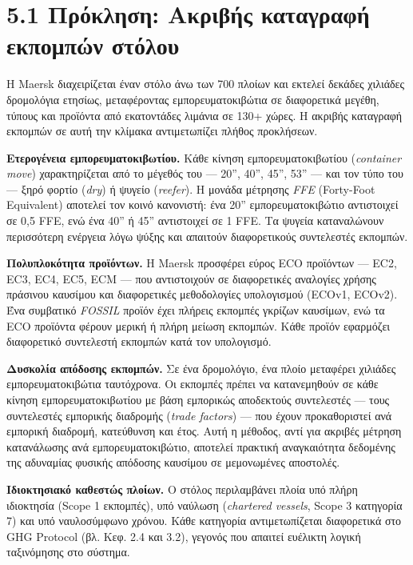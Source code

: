 \documentclass[11pt,a4paper,greek,twoside]{template-xe}
\begin{document}
\section{5.1 Πρόκληση: Ακριβής καταγραφή εκπομπών
στόλου}\label{ux3c0ux3c1ux3ccux3baux3bbux3b7ux3c3ux3b7-ux3b1ux3baux3c1ux3b9ux3b2ux3aeux3c2-ux3baux3b1ux3c4ux3b1ux3b3ux3c1ux3b1ux3c6ux3ae-ux3b5ux3baux3c0ux3bfux3bcux3c0ux3ceux3bd-ux3c3ux3c4ux3ccux3bbux3bfux3c5}

Η Maersk διαχειρίζεται έναν στόλο άνω των 700 πλοίων και εκτελεί δεκάδες
χιλιάδες δρομολόγια ετησίως, μεταφέροντας εμπορευματοκιβώτια σε
διαφορετικά μεγέθη, τύπους και προϊόντα από εκατοντάδες λιμάνια σε 130+
χώρες. Η ακριβής καταγραφή εκπομπών σε αυτή την κλίμακα αντιμετωπίζει
πλήθος προκλήσεων.

\textbf{Ετερογένεια εμπορευματοκιβωτίου.} Κάθε κίνηση
εμπορευματοκιβωτίου (\emph{container move}) χαρακτηρίζεται από το
μέγεθός του --- 20'', 40'', 45'', 53'' --- και τον τύπο του --- ξηρό
φορτίο (\emph{dry}) ή ψυγείο (\emph{reefer}). Η μονάδα μέτρησης
\emph{FFE} (Forty-Foot Equivalent) αποτελεί τον κοινό κανονιστή: ένα
20'' εμπορευματοκιβώτιο αντιστοιχεί σε 0,5 FFE, ενώ ένα 40'' ή 45''
αντιστοιχεί σε 1 FFE. Τα ψυγεία καταναλώνουν περισσότερη ενέργεια λόγω
ψύξης και απαιτούν διαφορετικούς συντελεστές εκπομπών.

\textbf{Πολυπλοκότητα προϊόντων.} Η Maersk προσφέρει εύρος ECO προϊόντων
--- EC2, EC3, EC4, EC5, ECM --- που αντιστοιχούν σε διαφορετικές
αναλογίες χρήσης πράσινου καυσίμου και διαφορετικές μεθοδολογίες
υπολογισμού (ECOv1, ECOv2). Ένα συμβατικό \emph{FOSSIL} προϊόν έχει
πλήρεις εκπομπές γκρίζων καυσίμων, ενώ τα ECO προϊόντα φέρουν μερική ή
πλήρη μείωση εκπομπών. Κάθε προϊόν εφαρμόζει διαφορετικό συντελεστή
εκπομπών κατά τον υπολογισμό.

\textbf{Δυσκολία απόδοσης εκπομπών.} Σε ένα δρομολόγιο, ένα πλοίο
μεταφέρει χιλιάδες εμπορευματοκιβώτια ταυτόχρονα. Οι εκπομπές πρέπει να
κατανεμηθούν σε κάθε κίνηση εμπορευματοκιβωτίου με βάση εμπορικώς
αποδεκτούς συντελεστές --- τους συντελεστές εμπορικής διαδρομής
(\emph{trade factors}) --- που έχουν προκαθοριστεί ανά εμπορική
διαδρομή, κατεύθυνση και έτος. Αυτή η μέθοδος, αντί για ακριβές μέτρηση
κατανάλωσης ανά εμπορευματοκιβώτιο, αποτελεί πρακτική αναγκαιότητα
δεδομένης της αδυναμίας φυσικής απόδοσης καυσίμου σε μεμονωμένες
αποστολές.

\textbf{Ιδιοκτησιακό καθεστώς πλοίων.} Ο στόλος περιλαμβάνει πλοία υπό
πλήρη ιδιοκτησία (Scope 1 εκπομπές), υπό ναύλωση (\emph{chartered
vessels}, Scope 3 κατηγορία 7) και υπό ναυλοσύμφωνο χρόνου. Κάθε
κατηγορία αντιμετωπίζεται διαφορετικά στο GHG Protocol (βλ. Κεφ. 2.4 και
3.2), γεγονός που απαιτεί ευέλικτη λογική ταξινόμησης στο σύστημα.
\end{document}
